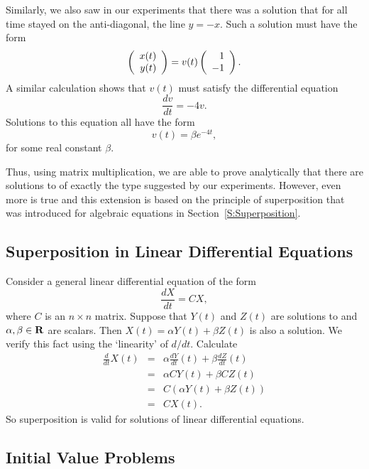 Similarly, we also saw in our \Matlab experiments that there was
a solution that for all time stayed on the anti-diagonal, the
line $y=-x$.  Such a solution must have the form
\[
\left(\begin{array}{r} x(t) \\ y(t)\end{array}\right) = v(t) \left(\begin{array}{r} 1 \\ -1\end{array}\right).
\]
A similar calculation shows that $v(t)$ must satisfy the
differential equation
\[
\frac{dv}{dt} = -4v.
\]
Solutions to this equation all have the form
\[
v(t) = \beta e^{-4t},
\]
for some real constant $\beta$.

Thus, using matrix multiplication, we are able to prove
analytically that there are solutions to  of exactly
the type suggested by our \Matlab experiments.  However, even
more is true and this extension is based on the principle of 
superposition that was introduced for algebraic equations in 
Section~\ref{S:Superposition}.  

\subsection*{Superposition in Linear Differential Equations}

Consider a general linear differential equation of the form
\begin{equation} \label{gen1}
\frac{dX}{dt} = CX,
\end{equation}
where $C$ is an $n\times n$ matrix.  Suppose that $Y(t)$ and
$Z(t)$ are solutions to  and $\alpha,\beta\in\mbox{$\bf{R}$}$ are
scalars.  Then $X(t)=\alpha Y(t)+\beta Z(t)$ is also a solution.
We verify this fact using the `linearity' of $d/dt$.  Calculate
\begin{eqnarray*}
\frac{d}{dt} X(t) & = &
\alpha \frac{dY}{dt}(t) + \beta \frac{dZ}{dt}(t) \\
 & = &\alpha CY(t) + \beta CZ(t)\\
 & = & C(\alpha Y(t) + \beta Z(t))\\
 & = & CX(t).
\end{eqnarray*}
So superposition is valid for solutions of linear differential equations.


\subsection*{Initial Value Problems}

